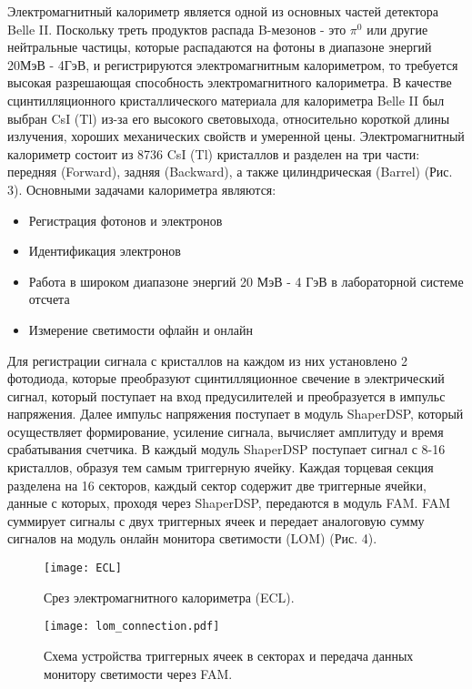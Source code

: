   Электромагнитный калориметр является одной из основных частей детектора Belle II. Поскольку треть продуктов распада B-мезонов - это $\pi^0$ или другие нейтральные частицы, которые распадаются на фотоны в диапазоне энергий 20МэВ - 4ГэВ, и регистрируются электромагнитным калориметром, то требуется высокая разрешающая способность электромагнитного калориметра. В качестве сцинтилляционного кристаллического материала для калориметра Belle II был выбран CsI (Tl) из-за его высокого световыхода, относительно короткой длины излучения, хороших механических свойств и умеренной цены. Электромагнитный калориметр состоит из 8736 CsI (Tl) кристаллов и разделен на три части: передняя (Forward), задняя (Backward), а также цилиндрическая (Barrel) (Рис. 3).
Основными задачами калориметра являются\cite{TechRep}:
\begin{itemize}
  \item Регистрация фотонов и электронов
  \item Идентификация электронов
  \item Работа в широком диапазоне энергий 20 МэВ - 4 ГэВ в лабораторной системе отсчета
  \item Измерение светимости офлайн и онлайн
\end{itemize}\par
  Для регистрации сигнала с кристаллов на каждом из них установлено 2 фотодиода, которые преобразуют сцинтилляционное свечение в электрический сигнал, который поступает на вход предусилителей и преобразуется в импульс напряжения. Далее импульс напряжения поступает в модуль ShaperDSP, который осуществляет формирование, усиление сигнала, вычисляет амплитуду и время срабатывания счетчика. В каждый модуль ShaperDSP поступает сигнал с 8-16 кристаллов, образуя тем самым триггерную ячейку. Каждая торцевая секция разделена на 16 секторов, каждый сектор содержит две триггерные ячейки, данные с которых, проходя через ShaperDSP, передаются в модуль FAM. FAM суммирует сигналы с двух триггерных ячеек и передает аналоговую сумму сигналов на модуль онлайн монитора светимости (LOM) (Рис. 4).
\begin{figure}
\centering
\begin{minipage}[t]{.5\textwidth}
  \centering
  \texttt{[image: ECL]}
  \caption{Срез электромагнитного калориметра (ECL).}
  \label{fig:test1}
\end{minipage}%
\begin{minipage}[t]{.5\textwidth}
  \centering
  \texttt{[image: lom\_connection.pdf]}
  \caption{Схема устройства триггерных ячеек в секторах и передача данных монитору светимости через FAM.}
  \label{fig:test2}
\end{minipage}
\end{figure}
